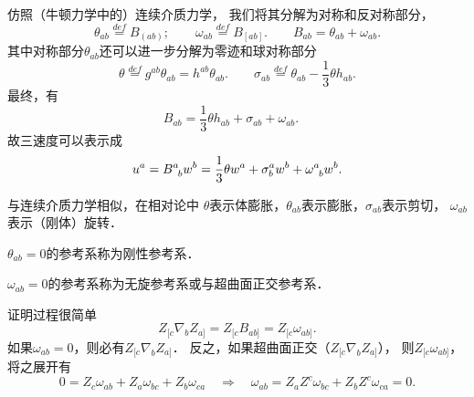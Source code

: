 仿照（牛顿力学中的）连续介质力学，
我们将其分解为对称和反对称部分，
\begin{equation}
    \theta_{ab}\overset{def}{=}  B_{(ab)}; \qquad
    \omega_{ab}\overset{def}{=}  B_{[ab]}. \qquad
    B_{ab} = \theta_{ab}+ \omega_{ab} .
\end{equation}
其中对称部分$\theta_{ab}$还可以进一步分解为零迹和球对称部分
\begin{equation}
    \theta \overset{def}{=} g^{ab} \theta_{ab} = h^{ab} \theta_{ab} . \qquad
    \sigma_{ab}\overset{def}{=} \theta_{ab} -\frac{1}{3}\theta h_{ab} .
\end{equation}
最终，有
\begin{equation}
    B_{ab} = \frac{1}{3}\theta h_{ab} + \sigma_{ab}+ \omega_{ab} . \quad
\end{equation}
故三速度可以表示成
\begin{equation}
    u^a= B_{\hphantom{a} b}^a w^b = \frac{1}{3}\theta w^a + \sigma_{b}^a w^b + \omega_{\hphantom{a} b}^a w^b .
\end{equation}

与连续介质力学相似，在相对论中
$\theta$表示体膨胀，$\theta_{ab}$表示膨胀，$\sigma_{ab}$表示剪切，
$\omega_{ab}$表示（刚体）旋转．

\begin{definition}
    $\theta_{ab}=0$的参考系称为{\heiti 刚性参考系}．
\end{definition}
\begin{definition}
    $\omega_{ab}=0$的参考系称为{\heiti 无旋参考系}或{\heiti 与超曲面正交参考系}．
\end{definition}
证明过程很简单
\begin{equation}
    Z_{[c} \nabla_{b} Z_{a]}= Z_{[c}B_{ab]} = Z_{[c}\omega_{ab]}.
\end{equation}
如果$\omega_{ab}=0$，则必有$Z_{[c} \nabla_{b} Z_{a]}$．
反之，如果超曲面正交（$Z_{[c} \nabla_{b} Z_{a]}$），
则$Z_{[c}\omega_{ab]}$，将之展开有
\begin{equation}
    0 = Z_{c}\omega_{ab} + Z_{a}\omega_{bc} + Z_{b}\omega_{ca} \quad \Rightarrow \quad
    \omega_{ab}=Z_{a} Z^c\omega_{bc} + Z_{b}Z^c\omega_{ca}=0.
\end{equation}

